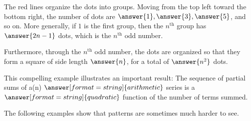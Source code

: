 \documentclass[nooutcomes]{ximera}
\begin{document}
\begin{problem}
\begin{problem}
\begin{problem}
The red lines organize the dots into groups. Moving from the top left toward the bottom right, the number of dots are $\answer{1},\answer{3},\answer{5}$, and so on.  More generally, if $1$ is the first group, then the $n^{\textrm{th}}$ group has $\answer{2n-1}$ dots, which is the $n^{\textrm{th}}$ odd number.  

Furthermore, through the $n^{\textrm{th}}$ odd number, the dots are organized so that they form a square of side length $\answer{n}$, for a total of $\answer{n^2}$ dots.  

This compelling example illustrates an important result:  The sequence of partial sums of a(n) $\answer[format=string]{arithmetic}$ series is a $\answer[format=string]{quadratic}$ function of the number of terms summed.  

The following examples show that patterns are sometimes much harder to see.  
\end{problem}
\end{problem}
\end{problem}
\end{document}
